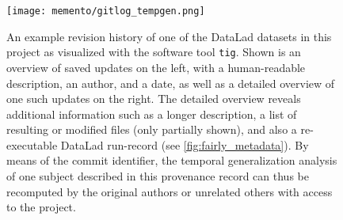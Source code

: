 \begin{figure}
	\centering
	\texttt{[image: memento/gitlog\_tempgen.png]}
	\caption[Provenance-tracked project results]{An example revision history of one of the DataLad datasets in this project as visualized with the software tool \texttt{tig}. Shown is an overview of saved updates on the left, with a human-readable description, an author, and a date, as well as a detailed overview of one such updates on the right. The detailed overview reveals additional information such as a longer description, a list of resulting or modified files (only partially shown), and also a re-executable DataLad run-record (see \ref{fig:fairly_metadata}). By means of the commit identifier, the temporal generalization analysis of one subject described in this provenance record can thus be recomputed by the original authors or unrelated others with access to the project.}
	\label{fig:git-log}
\end{figure}



